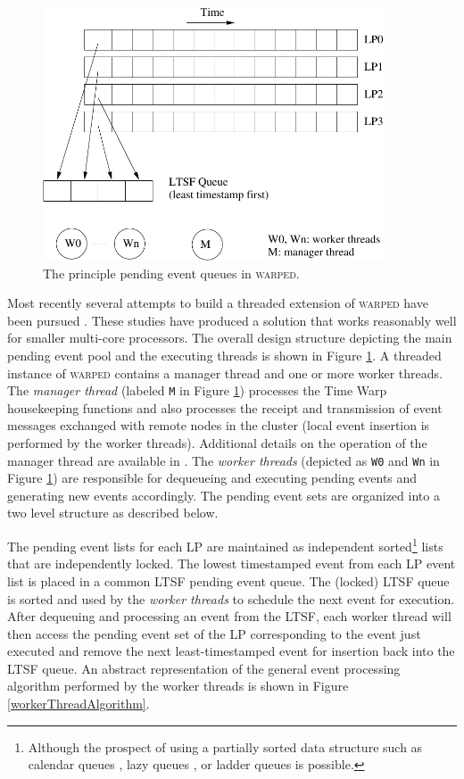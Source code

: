 \documentclass{sig-alternate}
\begin{document}
\begin{figure}
  \centerline{\includegraphics[width=4in]{figs/warpedLTSF}}
  \caption{The principle pending event queues in \textsc{warped}.}\label{warpedLTSF} 
\end{figure}

Most recently several attempts to build a threaded extension of \textsc{warped}
have been pursued \cite{miller-10,karthik-12}.  These studies have produced a
solution that works reasonably well for smaller multi-core processors.  The
overall design structure depicting the main pending event pool and the executing
threads is shown in Figure \ref{warpedLTSF}.  A threaded instance of
\textsc{warped} contains a manager thread and one or more worker threads.  The
\emph{manager thread} (labeled \texttt{M} in Figure \ref{warpedLTSF}) processes
the Time Warp housekeeping functions and also processes the receipt and
transmission of event messages exchanged with remote nodes in the cluster (local
event insertion is performed by the worker threads).  Additional details on the
operation of the manager thread are available in \cite{karthik-12}.  The
\emph{worker threads} (depicted as \texttt{W0} and \texttt{Wn} in Figure
\ref{warpedLTSF}) are responsible for dequeueing and executing pending events
and generating new events accordingly.  The pending event sets are organized
into a two level structure as described below.

The pending event lists for each LP are maintained as independent
sorted\footnote{Although the prospect of using a partially sorted data structure
  such as calendar queues \cite{brown-88}, lazy queues \cite{ronngren-91}, or
  ladder queues \cite{tang-05} is possible.} lists that are independently
locked.  The lowest timestamped event from each LP event list is placed in a
common LTSF pending event queue.  The (locked) LTSF queue is sorted and used by
the \emph{worker threads} to schedule the next event for execution.  After
dequeuing and processing an event from the LTSF, each worker thread will then
access the pending event set of the LP corresponding to the event just executed
and remove the next least-timestamped event for insertion back into the LTSF
queue.  An abstract representation of the general event processing algorithm
performed by the worker threads is shown in Figure \ref{workerThreadAlgorithm}.
\end{document}
